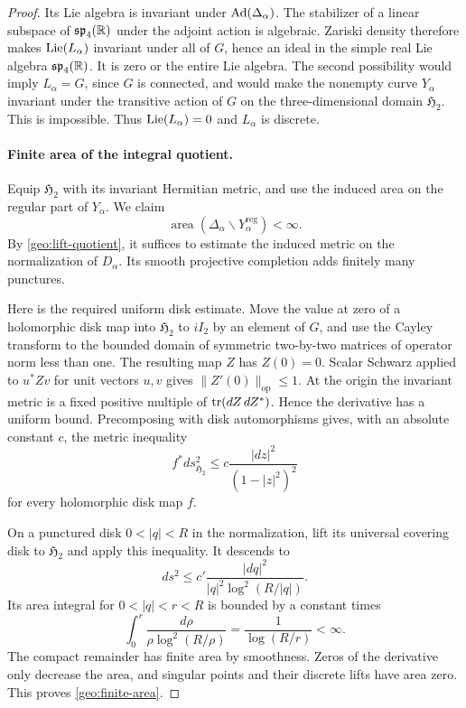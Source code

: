 \begin{proof}
Its Lie algebra is invariant under $\operatorname{Ad}(\Delta_\alpha)$.
The stabilizer of a linear subspace of $\mathfrak{sp}_4(\mathbb R)$
under the adjoint action is algebraic.  Zariski density therefore
makes $\operatorname{Lie}(L_\alpha)$ invariant under all of $G$, hence an
ideal in the simple real Lie algebra $\mathfrak{sp}_4(\mathbb R)$.
It is zero or the entire Lie algebra.  The second possibility
would imply $L_\alpha=G$, since $G$ is connected, and would make
the nonempty curve $Y_\alpha$ invariant under the transitive
action of $G$ on the three-dimensional domain $\mathfrak H_2$.
This is impossible.  Thus $\operatorname{Lie}(L_\alpha)=0$ and $L_\alpha$
is discrete.

\paragraph{Finite area of the integral quotient.}
Equip $\mathfrak H_2$ with its invariant Hermitian metric, and
use the induced area on the regular part of $Y_\alpha$.  We
claim
\begin{equation}\label{geo:finite-area}
 \operatorname{area}(\Delta_\alpha\backslash
                         Y_\alpha^{\mathrm{reg}})<\infty.
\end{equation}
By \eqref{geo:lift-quotient}, it suffices to estimate the induced
metric on the normalization of $D_\alpha$.  Its smooth
projective completion adds finitely many punctures.

Here is the required uniform disk estimate.  Move the value at
zero of a holomorphic disk map into $\mathfrak H_2$ to $iI_2$
by an element of $G$, and use the Cayley transform to the
bounded domain of symmetric two-by-two matrices of operator
norm less than one.  The resulting map $Z$ has $Z(0)=0$.
Scalar Schwarz applied to $u^*Z v$ for unit vectors $u,v$ gives
$\|Z'(0)\|_{\mathrm{op}}\leq1$.  At the origin the invariant
metric is a fixed positive multiple of
$\operatorname{tr}(dZ\,dZ^*)$.  Hence the derivative has a uniform bound.
Precomposing with disk automorphisms gives, with an absolute
constant $c$, the metric inequality
\[
 f^*ds^2_{\mathfrak H_2}
       \leq c\frac{|dz|^2}{(1-|z|^2)^2}
\]
for every holomorphic disk map $f$.

On a punctured disk $0<|q|<R$ in the normalization, lift its
universal covering disk to $\mathfrak H_2$ and apply this
inequality.  It descends to
\begin{equation}\label{geo:cusp-area}
 ds^2\leq c'\frac{|dq|^2}
 {|q|^2\log^2(R/|q|)}.
\end{equation}
Its area integral for $0<|q|<r<R$ is bounded by a constant
times
\[
 \int_0^r\frac{d\rho}{\rho\log^2(R/\rho)}
       =\frac{1}{\log(R/r)}<\infty.
\]
The compact remainder has finite area by smoothness.  Zeros of
the derivative only decrease the area, and singular points and
their discrete lifts have area zero.  This proves
\eqref{geo:finite-area}.


\end{proof}

